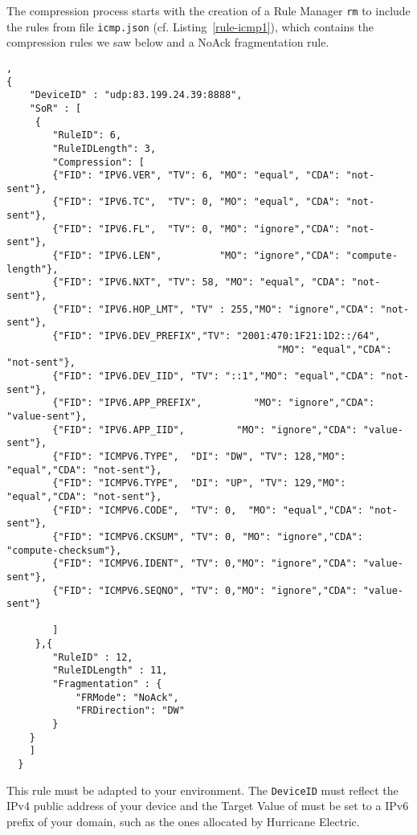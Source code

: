 
The compression process starts with the creation of a Rule Manager \texttt{rm} to include the rules from file \texttt{icmp.json} (cf. Listing~\vref{rule-icmp1}), which contains  the compression rules we saw below and a NoAck fragmentation rule.


\begin{lstlisting}[caption={rule icmp1.json}, backgroundcolor=\color{yellow}, label=rule-icmp1, basicstyle=\ttfamily\tiny],
{
    "DeviceID" : "udp:83.199.24.39:8888",
    "SoR" : [
	 {
	    "RuleID": 6,
	    "RuleIDLength": 3,
	    "Compression": [
		{"FID": "IPV6.VER", "TV": 6, "MO": "equal", "CDA": "not-sent"},
		{"FID": "IPV6.TC",  "TV": 0, "MO": "equal", "CDA": "not-sent"},
		{"FID": "IPV6.FL",  "TV": 0, "MO": "ignore","CDA": "not-sent"},
		{"FID": "IPV6.LEN",          "MO": "ignore","CDA": "compute-length"},
		{"FID": "IPV6.NXT", "TV": 58, "MO": "equal", "CDA": "not-sent"},
		{"FID": "IPV6.HOP_LMT", "TV" : 255,"MO": "ignore","CDA": "not-sent"},
		{"FID": "IPV6.DEV_PREFIX","TV": "2001:470:1F21:1D2::/64",
                                               "MO": "equal","CDA": "not-sent"},
		{"FID": "IPV6.DEV_IID", "TV": "::1","MO": "equal","CDA": "not-sent"},
		{"FID": "IPV6.APP_PREFIX",         "MO": "ignore","CDA": "value-sent"},
		{"FID": "IPV6.APP_IID",         "MO": "ignore","CDA": "value-sent"},
		{"FID": "ICMPV6.TYPE",  "DI": "DW", "TV": 128,"MO": "equal","CDA": "not-sent"},
		{"FID": "ICMPV6.TYPE",  "DI": "UP", "TV": 129,"MO": "equal","CDA": "not-sent"},
		{"FID": "ICMPV6.CODE",  "TV": 0,  "MO": "equal","CDA": "not-sent"},
		{"FID": "ICMPV6.CKSUM", "TV": 0, "MO": "ignore","CDA": "compute-checksum"},
		{"FID": "ICMPV6.IDENT", "TV": 0,"MO": "ignore","CDA": "value-sent"},
		{"FID": "ICMPV6.SEQNO", "TV": 0,"MO": "ignore","CDA": "value-sent"}
		
	    ]
	 },{
		"RuleID" : 12,
		"RuleIDLength" : 11,
		"Fragmentation" : {
			"FRMode": "NoAck",
			"FRDirection": "DW"
		}
	} 
    ]
  }
\end{lstlisting}

This rule must be adapted to your environment. The \texttt{DeviceID} must reflect the IPv4 public address of your device and the Target Value of  must be set to a IPv6 prefix of your domain, such as the ones allocated by Hurricane Electric.


